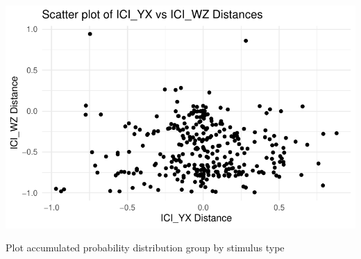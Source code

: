\documentclass[
  letterpaper,
  DIV=11,
  numbers=noendperiod]{scrartcl}
\begin{document}
\includegraphics{index_files/figure-pdf/unnamed-chunk-21-2.pdf}

Plot accumulated probability distribution group by stimulus type
\end{document}
